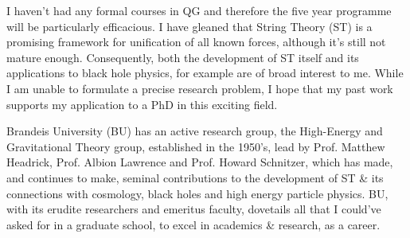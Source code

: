 I haven't had any formal courses in QG and therefore the five year programme will be particularly efficacious. I have gleaned that String Theory (ST) is a promising framework for unification of all known forces, although it's still not mature enough. Consequently, both the development of ST itself and its applications to black hole physics, for example are of broad interest to me. While I am unable to formulate a precise research problem, I hope that my past work supports my application to a PhD in this exciting field.

Brandeis University (BU) has an active research group, the High-Energy and Gravitational Theory group, established in the 1950's, lead by Prof. Matthew Headrick, Prof. Albion Lawrence and Prof. Howard Schnitzer, which has made, and continues to make, seminal contributions to the development of ST \& its connections with cosmology, black holes and high energy particle physics. BU, with its erudite researchers and emeritus faculty, dovetails all that I could've asked for in a graduate school, to excel in academics \& research, as a career.



